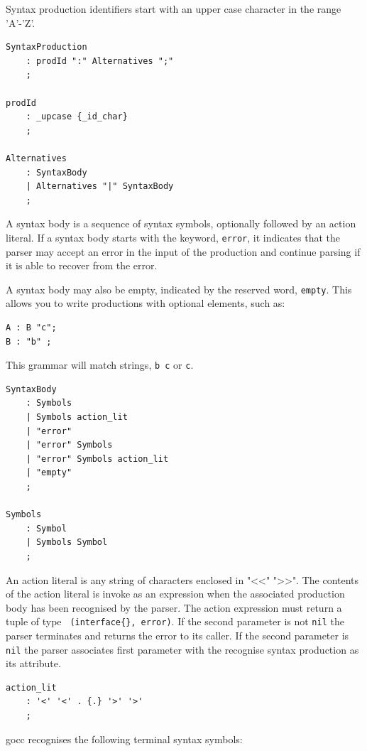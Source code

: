 \documentclass[12pt]{article}
\begin{document}
Syntax  production identifiers start with an upper case character in the range 'A'-'Z'.

\begin{Verbatim}[frame=single]
SyntaxProduction    
    : prodId ":" Alternatives ";"
    ;

prodId 
    : _upcase {_id_char} 
    ;

Alternatives    
    : SyntaxBody
    | Alternatives "|" SyntaxBody
    ;
\end{Verbatim}

A syntax body is a sequence of syntax symbols, optionally followed by an action literal. If a syntax body starts with the keyword, \verb|error|, it indicates that the parser may accept an error in the input of the production and continue parsing if it is able to recover from the error.

A syntax body may also be empty, indicated by the reserved word, \verb|empty|. This allows you to write productions with optional elements, such as:

\begin{verbatim}
A : B "c";
B : "b" ;
\end{verbatim}

This grammar will match strings, \verb|b c| or \verb|c|.

\begin{Verbatim}[frame=single]
SyntaxBody
    : Symbols
    | Symbols action_lit
    | "error"
    | "error" Symbols
    | "error" Symbols action_lit
    | "empty"
    ;

Symbols    
    : Symbol
    | Symbols Symbol
    ;
\end{Verbatim}

An action literal is any string of characters enclosed in "<<" ">>". The contents of the action literal is invoke as an expression when the associated production body has been recognised by the parser. The action expression must return a tuple of type \verb| (interface{}, error)|. If the second parameter is not \verb|nil| the parser terminates and returns the error to its caller. If the second parameter is \verb|nil| the parser associates first parameter with the recognise syntax production as its attribute.

\begin{Verbatim}[frame=single]
action_lit    
    : '<' '<' . {.} '>' '>' 
    ;
\end{Verbatim}

gocc recognises the following terminal syntax symbols:
\end{document}

